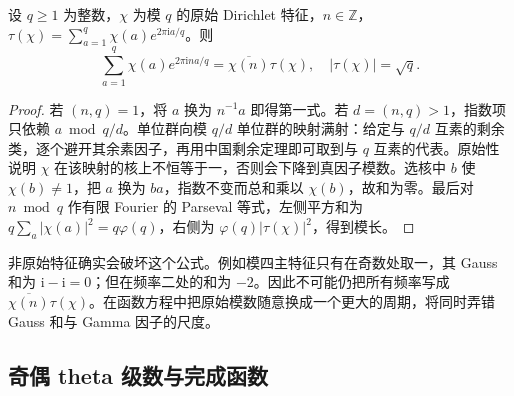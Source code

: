 \begin{lemma}[原始 Gauss 和]\label{b3:lem:D-gauss-sum}
设 \(q\ge1\) 为整数，\(\chi\) 为模 \(q\) 的原始 Dirichlet 特征，\(n\in\mathbb Z\)，\(\tau(\chi)=\sum_{a=1}^q\chi(a)e^{2\pi\mathrm{i}a/q}\)。则
\[
 \sum_{a=1}^q\chi(a)e^{2\pi\mathrm{i}na/q}=\overline{\chi(n)}\tau(\chi),
 \quad |\tau(\chi)|=\sqrt q.
\]
\end{lemma}
\begin{proof}
若 \((n,q)=1\)，将 \(a\) 换为 \(n^{-1}a\) 即得第一式。若 \(d=(n,q)>1\)，指数项只依赖 \(a\bmod q/d\)。单位群向模 \(q/d\) 单位群的映射满射：给定与 \(q/d\) 互素的剩余类，逐个避开其余素因子，再用中国剩余定理即可取到与 \(q\) 互素的代表。原始性说明 \(\chi\) 在该映射的核上不恒等于一，否则会下降到真因子模数。选核中 \(b\) 使 \(\chi(b)\ne1\)，把 \(a\) 换为 \(ba\)，指数不变而总和乘以 \(\chi(b)\)，故和为零。最后对 \(n\bmod q\) 作有限 Fourier 的 Parseval 等式，左侧平方和为 \(q\sum_a|\chi(a)|^2=q\varphi(q)\)，右侧为 \(\varphi(q)|\tau(\chi)|^2\)，得到模长。
\end{proof}
非原始特征确实会破坏这个公式。例如模四主特征只有在奇数处取一，其 Gauss 和为 \(\mathrm{i}-\mathrm{i}=0\)；但在频率二处的和为 \(-2\)。因此不可能仍把所有频率写成 \(\overline{\chi(n)}\tau(\chi)\)。在函数方程中把原始模数随意换成一个更大的周期，将同时弄错 Gauss 和与 Gamma 因子的尺度。

\subsection{奇偶 theta 级数与完成函数}
\label{b3:subsec:D0204}

